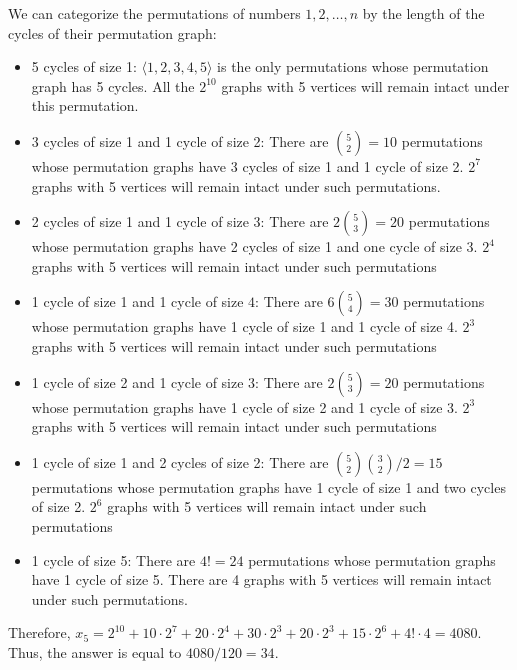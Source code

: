 \begin{solution}
We can categorize the permutations of numbers $1, 2, \ldots, n$ by the length of the cycles of their permutation graph:
\begin{itemize}
	\item 5 cycles of size 1: $\langle 1, 2, 3, 4 ,5 \rangle$ is the only permutations whose permutation graph has 5 cycles. All the $2^{10}$ graphs with 5 vertices will remain intact under this permutation.
	\item 3 cycles of size 1 and 1 cycle of size 2: There are $\binom{5}{2} = 10$ permutations whose permutation graphs have 3 cycles of size 1 and 1 cycle of size 2. $2^{7}$ graphs with 5 vertices will remain intact under such  permutations.
	\item 2 cycles of size 1 and 1 cycle of size 3: There are $2\binom{5}{3} = 20$ permutations whose permutation graphs have 2 cycles of size 1 and one cycle of size 3. $2^{4}$ graphs with 5 vertices will remain intact under such  permutations
	\item 1 cycle of size 1 and 1 cycle of size $4$: There are $6\binom{5}{4} = 30$ permutations whose permutation graphs have 1 cycle of size 1 and 1 cycle of size 4. $2^{3}$ graphs with 5 vertices will remain intact under such  permutations
	\item 1 cycle of size 2 and 1 cycle of size 3: There are $2\binom{5}{3} = 20$ permutations whose permutation graphs have 1 cycle of size 2 and 1 cycle of size 3. $2^{3}$ graphs with 5 vertices will remain intact under such  permutations
	\item 1 cycle of size 1 and 2 cycles of size 2: There are $\binom{5}{2} \binom{3}{2}/2 = 15$ permutations whose permutation graphs have 1 cycle of size 1 and two cycles of size 2. $2^{6}$ graphs with 5 vertices will remain intact under such  permutations
	\item 1 cycle of size 5: There are $4! = 24$ permutations whose permutation graphs have 1 cycle of size 5. There are 4 graphs with 5 vertices will remain intact under such  permutations.
\end{itemize}
Therefore, $x_5 = 2^{10} + 10\cdot 2^7 + 20\cdot 2^4 + 30\cdot 2^3 + 20\cdot 2^3 + 15\cdot 2^6 + 4!\cdot 4 = 4080$. Thus, the answer is equal to $4080/120 = 34$.\\[0.2cm]


\end{solution}
